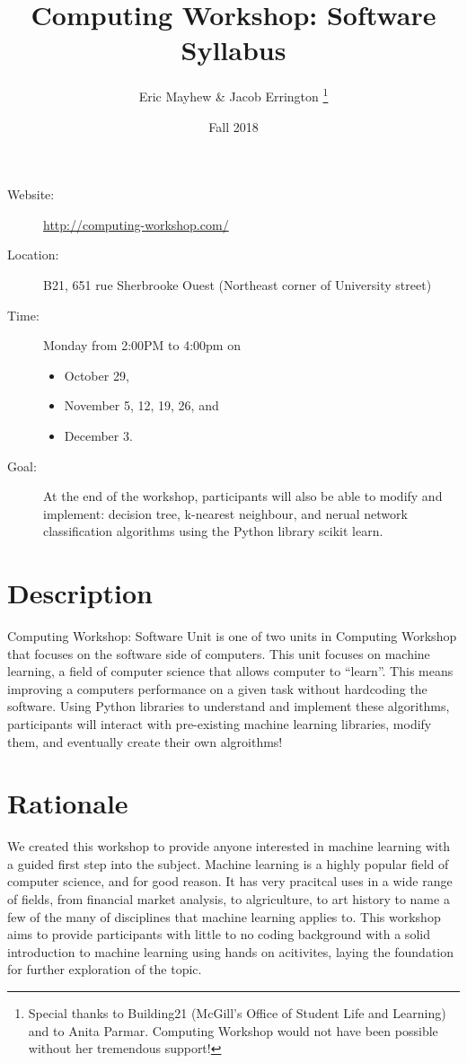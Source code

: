 \documentclass[11pt]{article}
\author{%
  Eric Mayhew \& Jacob Errington%
  \footnote{%
    Special thanks to Building21 (McGill's Office of Student Life and Learning)
    and to Anita Parmar.
    Computing Workshop would not have been possible without her tremendous
    support!
  }
}
\title{Computing Workshop: Software Syllabus}
\date{Fall 2018}
\begin{document}
\maketitle

\begin{description}
  \item[Website:]
    \url{http://computing-workshop.com/}

  \item[Location:]
    B21, 651 rue Sherbrooke Ouest
    (Northeast corner of University street)

  \item[Time:]
    Monday from 2:00PM to 4:00pm on
    \begin{itemize}
    \item October 29,
    \item November 5, 12, 19, 26, and
    \item December 3.
    \end{itemize}

  \item[Goal:]
    At the end of the workshop, participants will also be able to modify and implement: decision tree, k-nearest
    neighbour, and nerual network classification algorithms using the Python library scikit learn.

\end{description}

\section*{Description}

Computing Workshop: Software Unit is one of two units in Computing Workshop that
focuses on the software side of computers. This unit focuses on machine
learning, a field of computer science that allows computer to ``learn''. This
means improving a computers performance on a given task without hardcoding the
software. Using Python libraries to understand and implement these algorithms,
participants will interact with pre-existing machine learning libraries, modify
them, and eventually create their own algroithms!

\section*{Rationale}

We created this workshop to provide anyone interested in machine learning with a
guided first step into the subject. Machine learning is a highly popular field
of computer science, and for good reason. It has very pracitcal uses in a wide
range of fields, from financial market analysis, to algriculture, to art history to name a few of the many of
disciplines that machine learning
applies to. This workshop aims to provide participants with little to no coding
background with a solid introduction to machine learning using hands on
acitivites, laying the foundation for further exploration of the topic.
\end{document}

